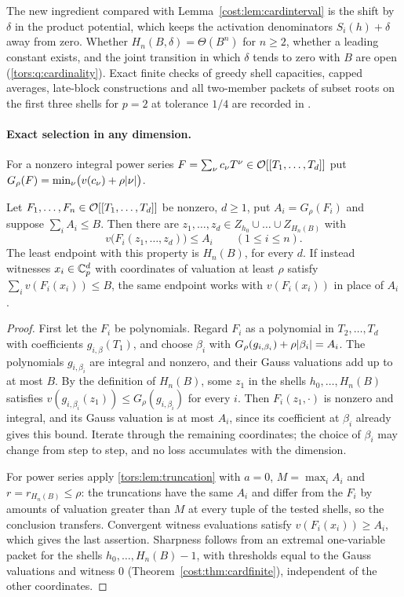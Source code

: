 The new ingredient compared with Lemma~\ref{cost:lem:cardinterval} is the shift by $\delta$
in the product potential, which keeps the activation denominators $S_i(h)+\delta$ away from
zero. Whether $H_n(B,\delta)=\Theta(B^n)$ for $n\ge2$, whether a leading constant exists,
and the joint transition in which $\delta$ tends to zero with $B$ are open
(\cref{tors:q:cardinality}). Exact finite checks of greedy shell capacities, capped
averages, late-block constructions and all two-member packets of subset roots on the first
three shells for $p=2$ at tolerance $1/4$ are recorded in
.

\paragraph{Exact selection in any dimension.}
For a nonzero integral power series $F=\sum_\nu c_\nu T^\nu\in\mathcal{O}[[T_1,\dots,T_d]]$ put
$G_\rho(F)=\min_\nu\bigl(v(c_\nu)+\rho\lvert\nu\rvert\bigr)$.

\begin{theorem}\label{cost:thm:cardmulti}
Let $F_1,\dots,F_n\in\mathcal{O}[[T_1,\dots,T_d]]$ be nonzero, $d\ge1$, put $A_i=G_\rho(F_i)$ and
suppose $\sum_iA_i\le B$. Then there are $z_1,\dots,z_d\in Z_{h_0}\cup\dots\cup Z_{H_n(B)}$
with
\[
 v\bigl(F_i(z_1,\dots,z_d)\bigr)\le A_i\qquad(1\le i\le n).
\]
The least endpoint with this property is $H_n(B)$, for every $d$. If instead witnesses
$x_i\in\mathbb{C}_p^d$ with coordinates of valuation at least $\rho$ satisfy
$\sum_iv(F_i(x_i))\le B$, the same endpoint works with $v(F_i(x_i))$ in place of $A_i$.
\end{theorem}

\begin{proof}
First let the $F_i$ be polynomials. Regard $F_i$ as a polynomial in $T_2,\dots,T_d$ with
coefficients $g_{i,\beta}(T_1)$, and choose $\beta_i$ with
$G_\rho(g_{i,\beta_i})+\rho\lvert\beta_i\rvert=A_i$. The polynomials $g_{i,\beta_i}$ are integral
and nonzero, and their Gauss valuations add up to at most $B$. By the definition of
$H_n(B)$, some $z_1$ in the shells $h_0,\dots,H_n(B)$ satisfies
$v(g_{i,\beta_i}(z_1))\le G_\rho(g_{i,\beta_i})$ for every $i$. Then $F_i(z_1,\cdot)$ is
nonzero and integral, and its Gauss valuation is at most $A_i$, since its coefficient at
$\beta_i$ already gives this bound. Iterate through the remaining coordinates; the choice of
$\beta_i$ may change from step to step, and no loss accumulates with the dimension.

For power series apply \cref{tors:lem:truncation} with $a=0$, $M=\max_iA_i$ and
$r=r_{H_n(B)}\le\rho$: the truncations have the same $A_i$ and differ from the $F_i$ by
amounts of valuation greater than $M$ at every tuple of the tested shells, so the
conclusion transfers. Convergent witness evaluations satisfy
$v(F_i(x_i))\ge A_i$, which gives the last assertion. Sharpness follows from an extremal
one-variable packet for the shells $h_0,\dots,H_n(B)-1$, with thresholds equal to the Gauss
valuations and witness $0$ (Theorem~\ref{cost:thm:cardfinite}), independent of the other
coordinates.
\end{proof}

